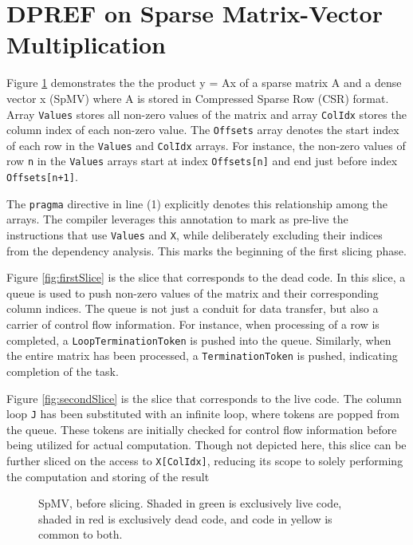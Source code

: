 \documentclass{acaces}
\begin{document}
\section{DPREF on Sparse Matrix-Vector Multiplication}

Figure \ref{fig:spmv} demonstrates the the product y = Ax of a sparse matrix A and a dense vector x (SpMV) where A is stored in Compressed Sparse Row (CSR) format.
Array \texttt{Values} stores all non-zero values of the matrix and array \texttt{ColIdx} stores the column index of each non-zero value.
The \texttt{Offsets} array denotes the start index of each row in the \texttt{Values} and \texttt{ColIdx} arrays.
For instance, the non-zero values of row \texttt{n} in the \texttt{Values} arrays start at index \texttt{Offsets[n]}
and end just before index \texttt{Offsets[n+1]}.

The \texttt{pragma} directive in line (1) explicitly denotes this relationship among the arrays.
The compiler leverages this annotation to mark as pre-live the instructions that use \texttt{Values} and \texttt{X},
while deliberately excluding their indices from the dependency analysis.
This marks the beginning of the first slicing phase.

Figure \ref{fig:firstSlice} is the slice that corresponds to the dead code.
In this slice, a queue is used to push non-zero values of the matrix and their corresponding column indices.
The queue is not just a conduit for data transfer, but also a carrier of control flow information.
For instance, when processing of a row is completed, a \texttt{LoopTerminationToken} is pushed into the queue.
Similarly, when the entire matrix has been processed, a \texttt{TerminationToken} is pushed, indicating completion of the task.

Figure \ref{fig:secondSlice} is the slice that corresponds to the live code.
The column loop \texttt{J} has been substituted with an infinite loop,
where tokens are popped from the queue.
These tokens are initially checked for control flow information before being utilized for actual computation.
Though not depicted here, this slice can be further sliced on the access to \texttt{X[ColIdx]},
reducing its scope to solely performing the computation and storing of the result

\begin{figure}[ht]
  \centering
  
  \caption{SpMV, before slicing. Shaded in green is exclusively live code, shaded in red is exclusively dead code, and code in yellow is common to both. }
  \label{fig:spmv}
\end{figure}
\end{document}
